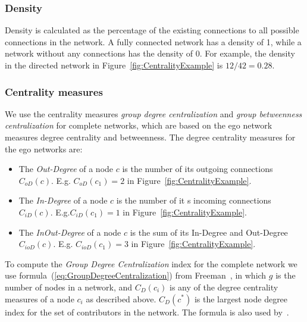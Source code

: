 \documentclass[12pt,oneside]{book}
\begin{document}

\subsubsection{Density}
Density is calculated as the percentage of the existing connections to all
possible connections in the network. A fully connected network has a density of
1, while a network without any connections has the density of 0. For example, the
density in the directed network in Figure~\ref{fig:CentralityExample} is
$12/42=0.28$.

\subsubsection{Centrality measures}
We use the centrality measures \emph{group degree centralization} and
\emph{group betweenness centralization} for complete networks, which are based on
the ego network measures degree centrality and betweenness. The degree
centrality measures for the ego networks are:

\begin{itemize}
  \item The \emph{Out-Degree} of a node $c$ is the
  number of its outgoing connections $C_{oD}(c)$. E.g. $C_{oD}(c_1)=2$ in 
  Figure~\ref{fig:CentralityExample}.
  
  \item The \emph{In-Degree} of a node $c$ is the
  number of it s incoming connections $C_{iD}(c)$. E.g.$C_{iD}(c_1)=1$ 
  in Figure~\ref{fig:CentralityExample}.
  
  \item The \emph{InOut-Degree} of a node $c$ is the sum of its In-Degree and
  Out-Degree $C_{ioD}(c)$. E.g. $C_{ioD}(c_1)=3$
  in Figure~\ref{fig:CentralityExample}.
\end{itemize}

To compute the \emph{Group Degree Centralization} index for the complete network
we use formula~(\ref{eq:GroupDegreeCentralization}) from
Freeman~\cite{Freeman:1979rl}, in which $g$ is the number of nodes in a network,
and $C_D(c_i)$ is any of the degree centrality measures of a node $c_i$ as
described above. $C_D(c^*)$ is the largest node degree index for the set of
contributors in the network. The formula is also used
by~\cite{Gloor:2003cikm,hinds:cscw:2006}.
\end{document}

